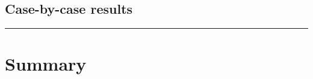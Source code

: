 \documentclass[12pt,a4paper]{article}
\begin{document}
\subsection{Case-by-case results}
\label{sec:case-by-case-results}
%
%

\noindent\rule{\textwidth}{0.4pt}
\FloatBarrier

\section{Summary}
\label{sec:summary}
%
\end{document}
